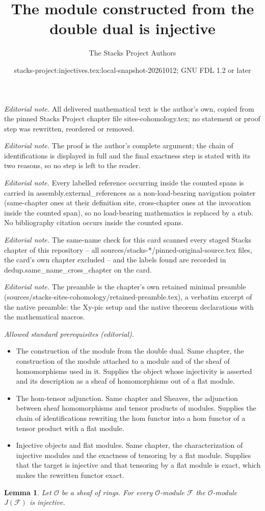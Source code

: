 \documentclass[10pt,a4paper]{amsart}
\title{The module constructed from the double dual is injective}
\author{The Stacks Project Authors}
\date{stacks-project:injectives.tex:local-snapshot-20261012; GNU FDL 1.2 or later}
\theoremstyle{plain}
\newtheorem{lemma}[subsection]{Lemma}
\theoremstyle{definition}
\theoremstyle{remark}
\numberwithin{equation}{subsection}
\begin{document}
\maketitle
\noindent\textit{Editorial note.} All delivered mathematical text is the author's own, copied from the pinned Stacks Project chapter file sites-cohomology.tex; no statement or proof step was rewritten, reordered or removed.\par\medskip
\noindent\textit{Editorial note.} The proof is the author's complete argument; the chain of identifications is displayed in full and the final exactness step is stated with its two reasons, so no step is left to the reader.\par\medskip
\noindent\textit{Editorial note.} Every labelled reference occurring inside the counted spans is carried in assembly.external\_references as a non-load-bearing navigation pointer (same-chapter ones at their definition site, cross-chapter ones at the invocation inside the counted span), so no load-bearing mathematics is replaced by a stub. No bibliography citation occurs inside the counted spans.\par\medskip
\noindent\textit{Editorial note.} The same-name check for this card scanned every staged Stacks chapter of this repository -- all sources/stacks-*/pinned-original-source.tex files, the card's own chapter excluded -- and the labels found are recorded in dedup.same\_name\_cross\_chapter on the card.\par\medskip
\noindent\textit{Editorial note.} The preamble is the chapter's own retained minimal preamble (sources/stacks-sites-cohomology/retained-preamble.tex), a verbatim excerpt of the native preamble: the Xy-pic setup and the native theorem declarations with the mathematical macros.\par\medskip
\noindent\textit{Allowed standard prerequisites (editorial).}\begin{itemize}
\item The construction of the module from the double dual. Same chapter, the construction of the module attached to a module and of the sheaf of homomorphisms used in it. Supplies the object whose injectivity is asserted and its description as a sheaf of homomorphisms out of a flat module.
\item The hom-tensor adjunction. Same chapter and Sheaves, the adjunction between sheaf homomorphisms and tensor products of modules. Supplies the chain of identifications rewriting the hom functor into a hom functor of a tensor product with a flat module.
\item Injective objects and flat modules. Same chapter, the characterization of injective modules and the exactness of tensoring by a flat module. Supplies that the target is injective and that tensoring by a flat module is exact, which makes the rewritten functor exact.
\end{itemize}\medskip
\begin{lemma}
\label{lemma-JM-injective-sheaves}
Let $\mathcal{O}$ be a sheaf of rings.
For every $\mathcal{O}$-module $\mathcal{F}$ the
$\mathcal{O}$-module $J(\mathcal{F})$ is injective.
\end{lemma}
\end{document}

